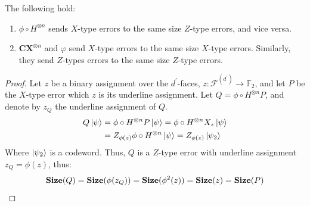 \begin{claim}
  \label{claim:bounded_size}
  The following hold:
  \begin{enumerate}
    \item $ \phi \circ  H^{\otimes n} $ sends $X$-type errors to the same size $Z$-type errors, and vice versa.  
    \item  $\mathbf{CX}^{\otimes n}$ and $\varphi$ send $X$-type errors to the same size $X$-type errors. Similarly, they send $Z$-types errors to the same size $Z$-type errors.  
  \end{enumerate}
\end{claim}
\begin{proof}
  Let $z$ be a binary assignment over the $d^{\prime}$-faces, $z : \mathcal{F}^{(d^{\prime})} \rightarrow \mathbb{F}_{2}$, and let $P$ be the $X$-type error which $z$ is its underline assignment. Let $ Q = \phi \circ H^{\otimes n} P $, and denote by $z_{Q}$ the underline assignment of $Q$. 
\begin{equation*}
  \begin{split}
    Q \ket{\psi} & = \phi \circ H^{\otimes n} P \ket{\psi} = \phi \circ H^{\otimes n} X_{z} \ket{\psi} \\ 
    & = Z_{\phi (z)} \phi \circ H^{\otimes n} \ket{\psi} = Z_{\phi (z) } \ket{\psi_{2}} 
  \end{split}
\end{equation*}
Where $\ket{\psi_{2}}$ is a codeword. Thus, $Q$ is a $Z$-type error with underline assignment $z_{Q} = \phi(z)$, thus: 
\begin{equation*}
  \begin{split}
    \mathbf{Size}(Q) = \mathbf{Size}(\phi(z_{Q})) = \mathbf{Size}(\phi^{2}(z) ) = \mathbf{Size}(z) = \mathbf{Size}(P)
  \end{split}
\end{equation*}



\end{proof}
